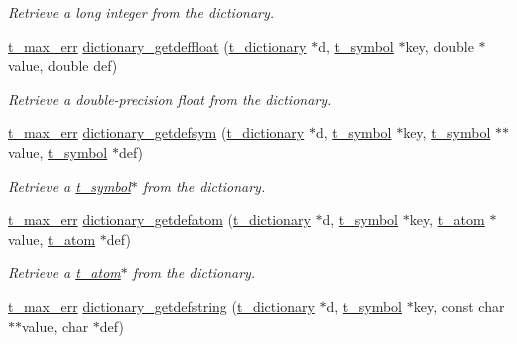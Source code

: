 \begin{DoxyCompactItemize}
\begin{DoxyCompactList}\small\item\em Retrieve a long integer from the dictionary. \item\end{DoxyCompactList}\item 
\hyperlink{group__datatypes_ga73edaae82b318855cc09fac994918165}{t\_\-max\_\-err} \hyperlink{group__dictionary_ga2c988f18fa22ab56aac4464bc7140438}{dictionary\_\-getdeffloat} (\hyperlink{structt__dictionary}{t\_\-dictionary} $\ast$d, \hyperlink{structt__symbol}{t\_\-symbol} $\ast$key, double $\ast$value, double def)
\begin{DoxyCompactList}\small\item\em Retrieve a double-\/precision float from the dictionary. \item\end{DoxyCompactList}\item 
\hyperlink{group__datatypes_ga73edaae82b318855cc09fac994918165}{t\_\-max\_\-err} \hyperlink{group__dictionary_ga2bf7497a4db16913aedb8c85036bf8c6}{dictionary\_\-getdefsym} (\hyperlink{structt__dictionary}{t\_\-dictionary} $\ast$d, \hyperlink{structt__symbol}{t\_\-symbol} $\ast$key, \hyperlink{structt__symbol}{t\_\-symbol} $\ast$$\ast$value, \hyperlink{structt__symbol}{t\_\-symbol} $\ast$def)
\begin{DoxyCompactList}\small\item\em Retrieve a \hyperlink{structt__symbol}{t\_\-symbol}$\ast$ from the dictionary. \item\end{DoxyCompactList}\item 
\hyperlink{group__datatypes_ga73edaae82b318855cc09fac994918165}{t\_\-max\_\-err} \hyperlink{group__dictionary_gaa447fe7ad80586bee323e1c2bf80bdf9}{dictionary\_\-getdefatom} (\hyperlink{structt__dictionary}{t\_\-dictionary} $\ast$d, \hyperlink{structt__symbol}{t\_\-symbol} $\ast$key, \hyperlink{structt__atom}{t\_\-atom} $\ast$value, \hyperlink{structt__atom}{t\_\-atom} $\ast$def)
\begin{DoxyCompactList}\small\item\em Retrieve a \hyperlink{structt__atom}{t\_\-atom}$\ast$ from the dictionary. \item\end{DoxyCompactList}\item 
\hyperlink{group__datatypes_ga73edaae82b318855cc09fac994918165}{t\_\-max\_\-err} \hyperlink{group__dictionary_ga3ced9bab630a199d920fffc163f4fe1b}{dictionary\_\-getdefstring} (\hyperlink{structt__dictionary}{t\_\-dictionary} $\ast$d, \hyperlink{structt__symbol}{t\_\-symbol} $\ast$key, const char $\ast$$\ast$value, char $\ast$def)

\end{DoxyCompactItemize}
